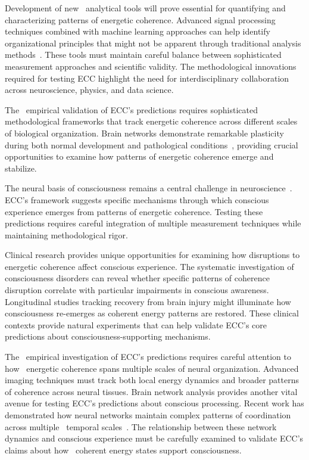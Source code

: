 Development of new~ analytical tools will prove essential for quantifying and characterizing patterns of energetic coherence. Advanced signal processing techniques combined with machine learning approaches can help identify organizational principles that might not be apparent through traditional analysis methods~\cite{Buzsaki2019}. These tools must maintain careful balance between sophisticated measurement approaches and scientific validity. The methodological innovations required for testing ECC highlight the need for interdisciplinary collaboration across neuroscience, physics, and data science.

The~ empirical validation of ECC's predictions requires sophisticated~ methodological frameworks that track energetic coherence across different scales of biological organization. Brain networks demonstrate remarkable plasticity during both normal development and pathological conditions~\cite{Vertes2015}, providing crucial opportunities to examine how patterns of energetic coherence emerge and stabilize.

The neural basis of consciousness remains a central challenge in neuroscience~\cite{Kucyi2017}. ECC's framework suggests specific mechanisms through which conscious experience emerges from patterns of energetic coherence. Testing these predictions requires careful integration of multiple measurement techniques while maintaining methodological rigor.

 Clinical research provides unique opportunities for examining how disruptions to energetic coherence affect conscious experience. The systematic investigation of~ consciousness disorders can reveal whether specific patterns of coherence disruption correlate with particular impairments in conscious awareness. Longitudinal studies tracking recovery from brain injury might illuminate how consciousness re-emerges as coherent energy patterns are restored. These clinical contexts provide natural experiments that can help validate ECC's core predictions about consciousness-supporting mechanisms.

The~ empirical investigation of ECC's predictions requires careful attention to how~ energetic coherence spans multiple scales of neural organization. Advanced imaging techniques must track both local energy dynamics and broader patterns of coherence across neural tissues.  Brain network analysis provides another vital avenue for testing ECC's predictions about conscious processing. Recent work has demonstrated how neural networks maintain complex patterns of coordination across multiple~ temporal scales~\cite{Palva2018}. The relationship between these network dynamics and conscious experience must be carefully examined to validate ECC's claims about how~ coherent energy states support consciousness.

